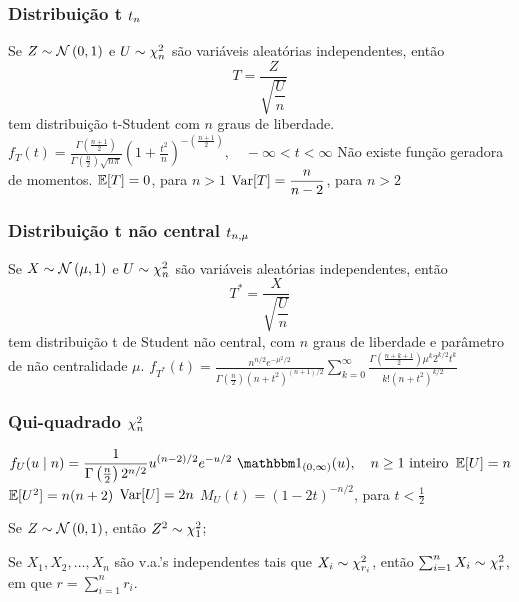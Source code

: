 \subsubsection{Distribuição t $t_{n}$}
\begin{outline}
	\1 Se $Z\sim\normdist{0,1}$ e $U\sim\chi^2_{n}$ são variáveis aleatórias independentes, então
	\begin{equation}
		T = \frac{Z}{\sqrt{\dfrac{U}{n}}}
	\end{equation}
	tem distribuição t-Student com $n$ graus de liberdade.
	\1 \(\displaystyle f_T(t) = \frac{\Gamma\left(\frac{n+1}{2}\right)}{\Gamma\left(\frac{n}{2}\right)\sqrt{n\pi}}\left(1+\frac{t^2}{n}\right)^{-\left(\frac{n+1}{2}\right)}, \quad -\infty<t<\infty\)
	\1 Não existe função geradora de momentos.
	\1 $\operatorname{\mathbb{E}}[T] = 0$, para $n>1$
	\1 $\operatorname{Var}[T] = \dfrac{n}{n-2}$, para $n>2$
\end{outline}

\subsubsection{Distribuição t não central $t_{n,\mu}$}
\begin{outline}
	\1 Se $X\sim\normdist{\mu,1}$ e $U\sim\chi^2_{n}$ são variáveis aleatórias independentes, então
	\begin{equation}
		T^* = \frac{X}{\sqrt{\dfrac{U}{n}}}
	\end{equation}
	tem distribuição t de Student não central, com $n$ graus de liberdade e parâmetro de não centralidade $\mu$.
	\1 \(\displaystyle f_{T^*}(t) = \frac{n^{n/2}e^{-\mu^2/2}}{\Gamma\left(\frac{n}{2}\right)(n+t^2)^{(n+1)/2}}\sum_{k=0}^{\infty}\frac{\Gamma\left(\frac{n+k+1}{2}\right)\mu^k 2^{k/2}t^k}{k!(n+t^2)^{k/2}}\)
\end{outline}

\subsubsection{Qui-quadrado $\chi^2_{n}$}
\begin{outline}
	\1 \(\displaystyle f_U(u\mid n) = \frac{1}{\Gamma\left(\frac{n}{2}\right)2^{n/2}}u^{(n-2)/2}e^{-u/2}\,\ind_{(0,\infty)}(u), \quad n\geq 1 \text{ inteiro}\)
	\1 \( \operatorname{\mathbb{E}}[U] = n \)
	\1 \( \operatorname{\mathbb{E}}[U^2] = n(n+2) \)
	\1 \( \operatorname{Var}[U] = 2n \)
	\1 \(\displaystyle M_U(t) = (1-2t)^{-n/2} \), para $t<\frac{1}{2}$
\end{outline}

\begin{theorem}
	\leavevmode
	\begin{outline}[enumerate]
		\1 Se $Z \sim \normdist{0,1}$, então $Z^2 \sim \chi^2_{1}$;
		
		\1 Se $X_1, X_2, \ldots, X_n$ são v.a.'s independentes tais que $X_i \sim \chi^2_{r_i}$, então $\sum_{i=1}^{n} X_i \sim \chi^2_{r}$, em que $r = \sum_{i=1}^{n} r_i$.
	\end{outline}
\end{theorem}

